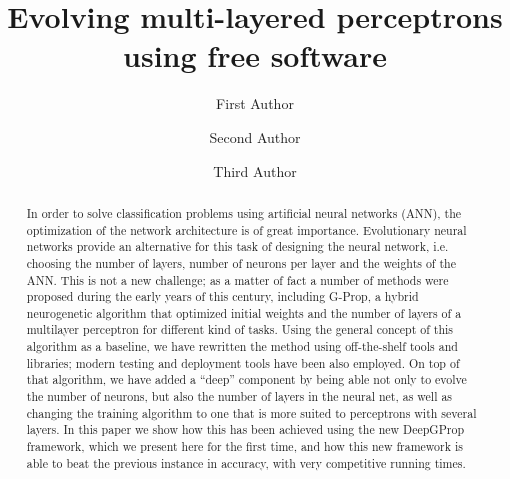 \documentclass[runningheads]{llncs}
\begin{document}
%
\title{Evolving multi-layered perceptrons using free software}
%
%
\author{First Author \and
Second Author \and
Third Author}
%
%
%
\maketitle              %

\begin{abstract}

In order to solve classification problems using artificial neural
networks (ANN), the optimization of the network architecture is 
of great importance. Evolutionary neural networks provide an
alternative for this task of designing the neural network, i.e. choosing the
number of layers, number of neurons per layer and the weights of the
ANN. This is not a new challenge; as a matter of fact a number of
methods were proposed during the early years of this century,
including G-Prop, a hybrid neurogenetic algorithm that optimized
initial weights and the number of layers of a multilayer perceptron for
different kind of tasks. Using the general concept of this algorithm
as a baseline, we have rewritten the method using off-the-shelf tools
and libraries; modern testing and deployment tools have been also
employed. On top of that algorithm, we have added a ``deep'' component
by being able not only to evolve the number of neurons, but also the
number of layers in the neural net, as well as changing the training
algorithm to one that is more suited to perceptrons with several
layers. In this paper we show how this has
been achieved using the new DeepGProp framework, which we present
here for the first time, and how this new framework is able to beat the
previous instance in accuracy, with very competitive running times.


\end{abstract}
\end{document}
